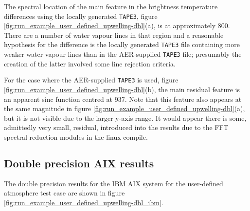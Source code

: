 The spectral location of the main feature in the brightness temperature differences using the locally generated \texttt{TAPE3}, figure \ref{fig:run_example_user_defined_upwelling-dbl}(a), is at approximately 800\invcm{}. There are a number of water vapour lines in that region and a reasonable hypothesis for the difference is the locally generated \texttt{TAPE3} file containing more weaker water vapour lines than in the AER-supplied \texttt{TAPE3} file; presumably the creation of the latter involved some line rejection criteria.

For the case where the AER-supplied \texttt{TAPE3} is used, figure \ref{fig:run_example_user_defined_upwelling-dbl}(b), the main residual feature is an apparent sinc function centred at 937\invcm. Note that this feature also appears at the same magnitude in figure  \ref{fig:run_example_user_defined_upwelling-dbl}(a), but it is not visible due to the larger y-axis range. It would appear there is some, admittedly very small, residual, introduced into the results due to the FFT spectral reduction modules in the linux compile.


\subsection{Double precision AIX results}

The double precision results for the IBM AIX system for the user-defined atmosphere test case are shown in figure \ref{fig:run_example_user_defined_upwelling-dbl_ibm}.

